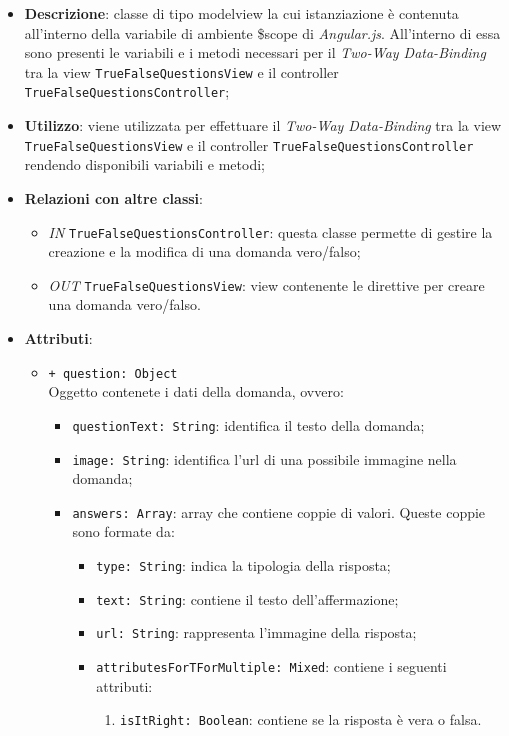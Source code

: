 \begin{itemize}
	\item \textbf{Descrizione}: classe di tipo modelview la cui istanziazione è contenuta all'interno della variabile di ambiente \$scope di \textit{Angular.js}. All'interno di essa sono presenti le variabili e i metodi necessari per il \textit{Two-Way Data-Binding} tra la view \texttt{TrueFalseQuestionsView} e il controller \texttt{TrueFalseQuestionsController}; 
	\item \textbf{Utilizzo}: viene utilizzata per effettuare il \textit{Two-Way Data-Binding} tra la view \texttt{TrueFalseQuestionsView} e il controller \texttt{TrueFalseQuestionsController} rendendo disponibili variabili e metodi;
	\item \textbf{Relazioni con altre classi}:
	\begin{itemize}
		\item \textit{IN} \texttt{TrueFalseQuestionsController}: questa classe permette di gestire la creazione e la modifica di una domanda vero/falso;
		\item \textit{OUT} \texttt{TrueFalseQuestionsView}: view contenente le direttive per creare una domanda vero/falso.
	\end{itemize}
	\item \textbf{Attributi}:
	\begin{itemize}
	  \item \texttt{+ question: Object} \\ Oggetto contenete i dati della domanda, ovvero:
	  \begin{itemize}
		\item \texttt{questionText: String}: identifica il testo della domanda;
		\item \texttt{image: String}: identifica l'url di una possibile immagine nella domanda;
		\item \texttt{answers: Array}: array che contiene coppie di valori. Queste coppie sono formate da:
		\begin{itemize}
			\item \texttt{type: String}: indica la tipologia della risposta;
			\item \texttt{text: String}: contiene il testo dell'affermazione;
			\item \texttt{url: String}: rappresenta l'immagine della risposta;
			\item \texttt{attributesForTForMultiple: Mixed}: contiene i seguenti attributi:
			\begin{enumerate}
				\item \texttt{isItRight: Boolean}: contiene se la risposta è vera o falsa.

\end{enumerate}
\end{itemize}
\end{itemize}
\end{itemize}
\end{itemize}
